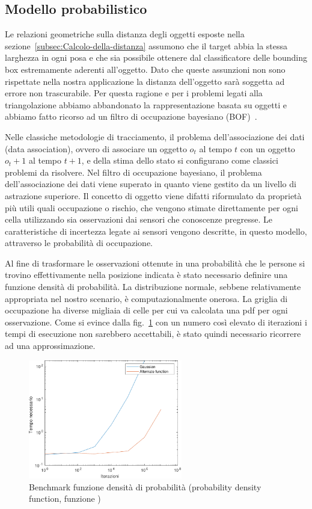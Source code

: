 \documentclass[a4paper]{article}
\begin{document}
	
	\subsection{Modello probabilistico}\label{subsec:Modello-probabilistico}
	Le relazioni geometriche sulla distanza degli oggetti esposte nella
	sezione~\ref{subsec:Calcolo-della-distanza} assumono che il target abbia la
	stessa larghezza in ogni posa e che sia possibile ottenere dal
	classificatore delle bounding box estremamente aderenti all'oggetto. Dato che queste
	assunzioni non sono rispettate nella nostra applicazione la distanza
	dell'oggetto sarà soggetta ad errore non trascurabile. Per questa
	ragione e per i problemi legati alla triangolazione abbiamo abbandonato la
	rappresentazione basata su oggetti e abbiamo fatto ricorso ad un filtro di
	occupazione bayesiano (BOF)~\cite{tay2008bayesian}.

	Nelle classiche metodologie di tracciamento, il problema dell'associazione
	dei dati (data association), ovvero di associare un oggetto $o_t$ al tempo
	$t$ con un oggetto $o_t+1$ al tempo $t+1$, e della stima dello stato si
	configurano come classici problemi da risolvere. Nel filtro di occupazione
	bayesiano, il problema dell'associazione dei dati viene superato in quanto
	viene gestito da un livello di astrazione superiore. Il concetto di oggetto
	viene difatti riformulato da proprietà più utili quali occupazione o
	rischio, che vengono stimate direttamente per ogni cella utilizzando sia
	osservazioni dai sensori che conoscenze pregresse. Le caratteristiche di
	incertezza legate ai sensori vengono descritte, in questo modello,
	attraverso le probabilità di occupazione.

	Al fine di trasformare le osservazioni ottenute in una probabilità che le
	persone si trovino effettivamente nella posizione indicata è stato
	necessario definire una funzione densità di probabilità. La distribuzione
	normale, sebbene relativamente appropriata nel nostro scenario, è
	computazionalmente onerosa. La griglia di occupazione ha diverse migliaia
	di celle per cui va calcolata una pdf per ogni osservazione. Come si evince
	dalla fig.~\ref{fig:pdf_benchmark} con un numero così elevato di iterazioni
	i tempi di esecuzione non sarebbero accettabili, è stato quindi necessario
	ricorrere ad una approssimazione.
	
	\begin{figure}[H]
		\centering
		\includegraphics[width=0.6\textwidth]{./img/pdf_benchmark.pdf}
		\caption{Benchmark funzione densità di probabilità (probability density function, funzione )}
		\label{fig:pdf_benchmark}
	\end{figure}
\end{document}
